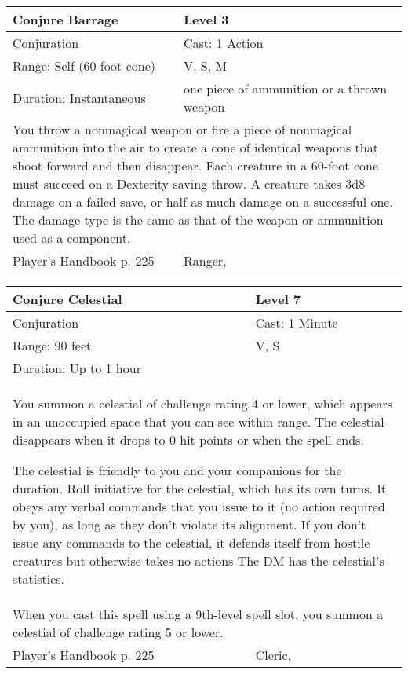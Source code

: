 \documentclass[11pt]{report}
\begin{document}
\begin{table}[H]
	\begin{tabular}{||p{6cm}|p{6cm}||}
		\hline\hline
		\bf{Conjure Barrage} & Level 3\\ \hline
		Conjuration & Cast: 1 Action\\ \hline
		Range: Self (60-foot cone) & V, S, M \\ \hline
		Duration: Instantaneous & one piece of ammunition or a thrown weapon\\ \hline
		\multicolumn{2}{||p{12cm}||}{You throw a nonmagical weapon or fire a piece of nonmagical ammunition into the air to create a cone of identical weapons that shoot forward and then disappear. Each creature in a 60-foot cone must succeed on a Dexterity saving throw. A creature takes 3d8 damage on a failed save, or half as much damage on a successful one. The damage type is the same as that of the weapon or ammunition used as a component.}\\ \hline
Player's Handbook p. 225 & Ranger, \\ \hline\hline
	\end{tabular}
\end{table}

\begin{table}[H]
	\begin{tabular}{||p{6cm}|p{6cm}||}
		\hline\hline
		\bf{Conjure Celestial} & Level 7\\ \hline
		Conjuration & Cast: 1 Minute\\ \hline
		Range: 90 feet & V, S\\ \hline
		Duration: Up to 1 hour & \\ \hline
		\multicolumn{2}{||p{12cm}||}{You summon a celestial of challenge rating 4 or lower, which appears in an unoccupied space that you can see within range. The celestial disappears when it drops to 0 hit points or when the spell ends. 

The celestial is friendly to you and your companions for the duration. Roll initiative for the celestial, which has its own turns. It obeys any verbal commands that you issue to it (no action required by you), as long as they don’t violate its alignment. If you don’t issue any commands to the celestial, it defends itself from hostile creatures but otherwise takes no actions 
The DM has the celestial’s statistics.}\\ \hline
		\multicolumn{2}{||p{12cm}||}{When you cast this spell using a 9th-level spell slot, you summon a celestial of challenge rating 5 or lower.}\\ \hline
Player's Handbook p. 225 & Cleric, \\ \hline\hline
	\end{tabular}
\end{table}
\end{document}
